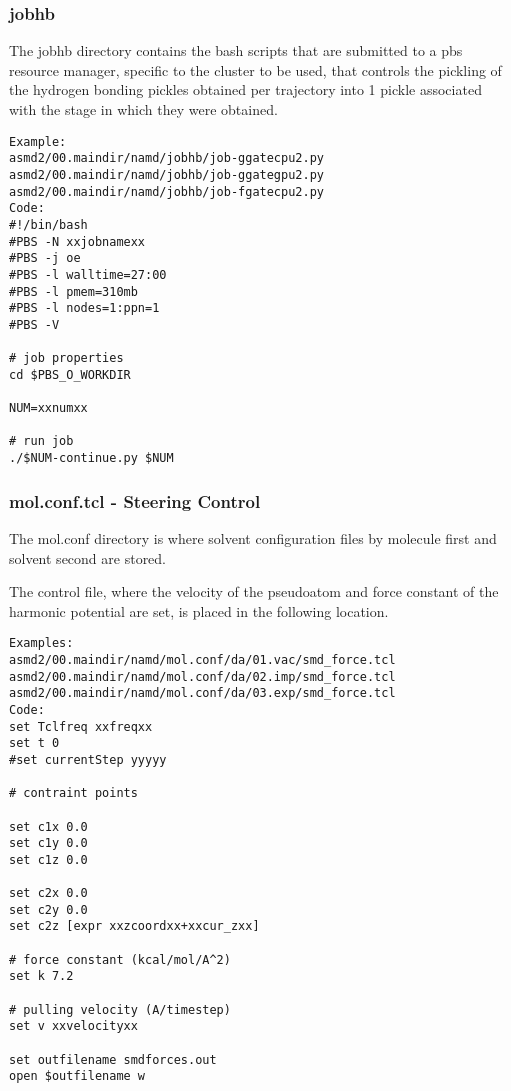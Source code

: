 \documentclass[11pt]{article}
\begin{document}
\subsubsection{jobhb}
The jobhb directory contains the bash scripts that are submitted to a pbs resource manager, specific to the cluster to be used, that controls the pickling of the hydrogen bonding pickles obtained per trajectory into 1 pickle associated with the stage in which they were obtained.
\begin{verbatim}
Example:
asmd2/00.maindir/namd/jobhb/job-ggatecpu2.py
asmd2/00.maindir/namd/jobhb/job-ggategpu2.py
asmd2/00.maindir/namd/jobhb/job-fgatecpu2.py
Code:
#!/bin/bash
#PBS -N xxjobnamexx
#PBS -j oe
#PBS -l walltime=27:00
#PBS -l pmem=310mb
#PBS -l nodes=1:ppn=1
#PBS -V

# job properties
cd $PBS_O_WORKDIR

NUM=xxnumxx

# run job
./$NUM-continue.py $NUM
\end{verbatim}

\subsubsection{mol.conf.tcl - Steering Control}
The mol.conf directory is where solvent configuration files by molecule first and solvent second are stored.

The control file, where the velocity of the pseudoatom and force constant of the harmonic potential are set, is placed in the following location.

\begin{verbatim}
Examples:
asmd2/00.maindir/namd/mol.conf/da/01.vac/smd_force.tcl
asmd2/00.maindir/namd/mol.conf/da/02.imp/smd_force.tcl
asmd2/00.maindir/namd/mol.conf/da/03.exp/smd_force.tcl
Code:
set Tclfreq xxfreqxx
set t 0
#set currentStep yyyyy

# contraint points

set c1x 0.0
set c1y 0.0
set c1z 0.0

set c2x 0.0
set c2y 0.0
set c2z [expr xxzcoordxx+xxcur_zxx]

# force constant (kcal/mol/A^2)
set k 7.2

# pulling velocity (A/timestep)
set v xxvelocityxx

set outfilename smdforces.out
open $outfilename w
\end{verbatim}
\end{document}
